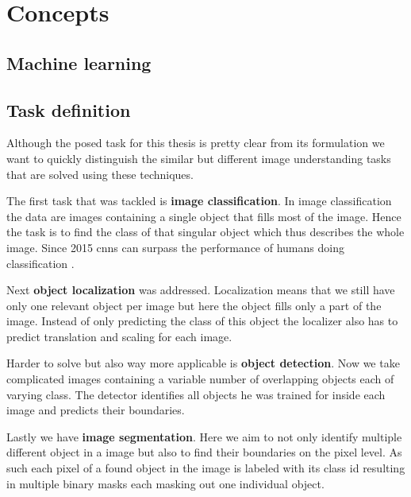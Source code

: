 %
\chapter{Concepts}
\label{sec:concepts}


\section{Machine learning}
\label{sec:concepts:ml}

\section{Task definition}
\label{sec:concepts:tasks}
Although the posed task for this thesis is pretty clear from its formulation we want to quickly distinguish the similar but different image understanding tasks that are solved using these techniques.

The first task that was tackled is \textbf{image classification}. In image classification the data are images containing a single object that fills most of the image. Hence the task is to find the class of that singular object which thus describes the whole image. Since 2015 \glspl{cnn} can surpass the performance of humans doing classification \citep{he_delving_2015}.

Next \textbf{object localization} was addressed. Localization means that we still have only one relevant object per image but here the object fills only a part of the image. Instead of only predicting the class of this object the localizer also has to predict translation and scaling for each image.

Harder to solve but also way more applicable is \textbf{object detection}. Now we take complicated images containing a variable number of overlapping objects each of varying class. The detector identifies all objects he was trained for inside each image and predicts their boundaries.

Lastly we have \textbf{image segmentation}. Here we aim to not only identify multiple different object in a image but also to find their boundaries on the pixel level. As such each pixel of a found object in the image is labeled with its class id resulting in multiple binary masks each masking out one individual object.

